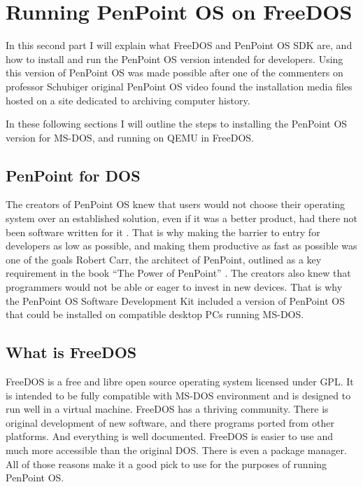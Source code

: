 \clearpage %

\section{Running PenPoint OS on FreeDOS}

In this second part I will explain what FreeDOS and PenPoint OS SDK are, and how
to install and run the PenPoint OS version intended for developers. Using this
version of PenPoint OS was made possible after one of the commenters on
professor Schubiger original PenPoint OS video found the installation media
files hosted on a site dedicated to archiving computer history.

In these following sections I will outline the steps to installing the
PenPoint OS version for MS-DOS, and running on QEMU in FreeDOS.

\subsection{PenPoint for DOS}

The creators of PenPoint OS knew that users would not choose their operating
system over an established solution, even if it was a better product, had there
not been software written for it \cite{barbariansbillgates}. That is why making
the barrier to entry for developers as low as possible, and making them
productive as fast as possible was one of the goals Robert Carr, the architect
of PenPoint, outlined as a key requirement in the book ``The Power of
PenPoint'' \cite{carr1991}. The creators also knew that programmers would not
be able or eager to invest in new devices.  That is why the PenPoint OS Software
Development Kit included a version of PenPoint OS that could be installed on
compatible desktop PCs running MS-DOS.

\subsection{What is FreeDOS}

FreeDOS is a free and libre open source operating system licensed under GPL. It
is intended to be fully compatible with MS-DOS environment and is designed to
run well in a virtual machine. FreeDOS has a thriving community. There is
original development of new software, and there programs ported from other
platforms. And everything is well documented.  FreeDOS is easier to use and
much more accessible than the original DOS.  There is even a package manager.
All of those reasons make it a good pick to use for the purposes of running
PenPoint OS.

